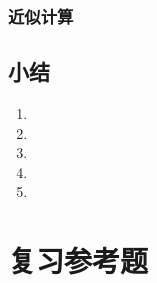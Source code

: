\subsection{近似计算}
\begin{Practice}
  \begin{question}
    \item 
    \item 
    \item 
    \item 
  \end{question}
\end{Practice}

\begin{Exercise}
  \begin{question}
    \item 
    \item 
    \item 
    \item 
    \item 
    \item 
    \item 
    \item 
    \item 
  \end{question}
\end{Exercise}

\section*{小结}
\begin{enumerate}[C、,itemindent=4.5em]
  \item 
  \item 
  \item 
  \item 
  \item 
\end{enumerate}

\chapter*{复习参考题}
